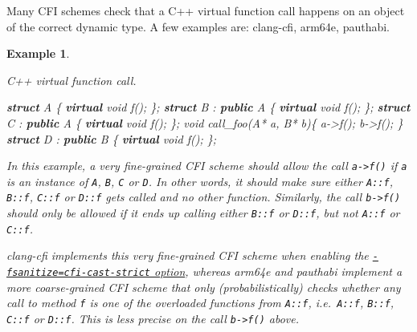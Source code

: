 \documentclass[
  a4paper,
]{report}
\newtheorem{example}{Example}
\newenvironment{Shaded}{}{}
\newcommand{\DataTypeTok}[1]{\textcolor[rgb]{0.56,0.13,0.00}{#1}}
\newcommand{\KeywordTok}[1]{\textcolor[rgb]{0.00,0.44,0.13}{\textbf{#1}}}
\newcommand{\NormalTok}[1]{#1}
\newcommand{\OperatorTok}[1]{\textcolor[rgb]{0.40,0.40,0.40}{#1}}
\begin{document}
Many CFI schemes check that a
\label{__index_entry_41}{C++} virtual function
call happens on an object of the correct dynamic type. A few examples
are: clang-cfi, arm64e, pauthabi.

\begin{example}

\label{}

\textup{C++ virtual function call.}

\begin{Shaded}
\begin{Highlighting}[]
\KeywordTok{struct}\NormalTok{ A }\OperatorTok{\{}
  \KeywordTok{virtual} \DataTypeTok{void}\NormalTok{ f}\OperatorTok{();}
\OperatorTok{\};}
\KeywordTok{struct}\NormalTok{ B }\OperatorTok{:} \KeywordTok{public}\NormalTok{ A }\OperatorTok{\{}
  \KeywordTok{virtual} \DataTypeTok{void}\NormalTok{ f}\OperatorTok{();}
\OperatorTok{\};}
\KeywordTok{struct}\NormalTok{ C }\OperatorTok{:} \KeywordTok{public}\NormalTok{ A }\OperatorTok{\{}
  \KeywordTok{virtual} \DataTypeTok{void}\NormalTok{ f}\OperatorTok{();}
\OperatorTok{\};}
\DataTypeTok{void}\NormalTok{ call\_foo}\OperatorTok{(}\NormalTok{A}\OperatorTok{*}\NormalTok{ a}\OperatorTok{,}\NormalTok{ B}\OperatorTok{*}\NormalTok{ b}\OperatorTok{)\{}
\NormalTok{  a}\OperatorTok{{-}\textgreater{}}\NormalTok{f}\OperatorTok{();}
\NormalTok{  b}\OperatorTok{{-}\textgreater{}}\NormalTok{f}\OperatorTok{();}
\OperatorTok{\}}
\KeywordTok{struct}\NormalTok{ D }\OperatorTok{:} \KeywordTok{public}\NormalTok{ B }\OperatorTok{\{}
  \KeywordTok{virtual} \DataTypeTok{void}\NormalTok{ f}\OperatorTok{();}
\OperatorTok{\};}
\end{Highlighting}
\end{Shaded}

In this example, a very fine-grained CFI scheme should allow the call
\texttt{a-\textgreater{}f()} if \texttt{a} is an instance of \texttt{A},
\texttt{B}, \texttt{C} or \texttt{D}. In other words, it should make
sure either \texttt{A::f}, \texttt{B::f}, \texttt{C::f} or \texttt{D::f}
gets called and no other function. Similarly, the call
\texttt{b-\textgreater{}f()} should only be allowed if it ends up
calling either \texttt{B::f} or \texttt{D::f}, but not \texttt{A::f} or
\texttt{C::f}.

clang-cfi implements this very fine-grained CFI scheme when enabling the
\href{https://clang.llvm.org/docs/ControlFlowIntegrity.html\#strictness}{\texttt{-fsanitize=cfi-cast-strict}
option}, whereas arm64e and pauthabi implement a more coarse-grained CFI
scheme that only (probabilistically) checks whether any call to method
\texttt{f} is one of the overloaded functions from \texttt{A::f},
i.e.~\texttt{A::f}, \texttt{B::f}, \texttt{C::f} or \texttt{D::f}. This
is less precise on the call \texttt{b-\textgreater{}f()} above.

\end{example}
\end{document}
